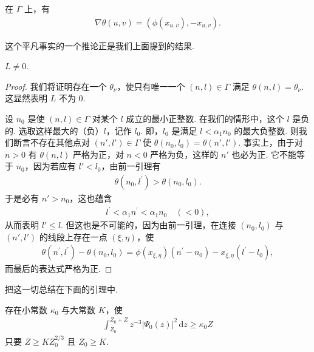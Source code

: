 \begin{lemma}\label{lem:9.21}
在 $\Gamma$ 上，有
\begin{align*}
  \nabla\theta(u,v)=(\phi(x_{u,v}),-x_{u,v}).
\end{align*}
\end{lemma}

这个平凡事实的一个推论正是我们上面提到的结果.

\begin{lemma}\label{lem:9.22}
$L \neq 0$.
\end{lemma}

\begin{proof}
我们将证明存在一个 $\theta_\nu$，使只有唯一一个 $(n,l) \in \Gamma$ 满足 $\theta(n,l) = \theta_\nu$. 这显然表明 $L$ 不为 $0$.

设 $n_0$ 是使 $(n, l) \in \Gamma$ 对某个 $l$ 成立的最小正整数. 在我们的情形中，这个 $l$ 是负的. 选取这样最大的（负）$l$，记作 $l_0$. 即，$l_0$ 是满足 $l < \alpha_1 n_0$ 的最大负整数. 则我们断言不存在其他点对 $(n', l') \in \Gamma$ 使 $\theta(n_0, l_0) = \theta(n', l')$. 事实上，由于对 $n > 0$ 有 $\theta(n, l)$ 严格为正，对 $n < 0$ 严格为负，这样的 $n'$ 也必为正. 它不能等于 $n_0$，因为若应有 $l' < l_0$，由前一引理有
\begin{align*}
  \theta(n_{0},l^{\prime})>\theta(n_{0},l_{0}).
\end{align*}
于是必有 $n' > n_0$，这也蕴含
\begin{align*}
  l^{\prime}<\alpha_{1}n^{\prime}<\alpha_{1}n_{0}\quad(<0),
\end{align*}
从而表明 $l' \leq l$. 但这也是不可能的，因为由前一引理，在连接 $(n_0, l_0)$ 与 $(n', l')$ 的线段上存在一点 $(\xi, \eta)$，使
\begin{align*}
  \theta(n^{\prime},l^{\prime})-\theta(n_{0},l_{0})
  =\phi(x_{\xi,\eta})\left(n^{\prime}-n_{0}\right)-x_{\xi,\eta}\left(l^{\prime}-l_{0}\right),
\end{align*}
而最后的表达式严格为正.
\end{proof}

把这一切总结在下面的引理中.

\begin{lemma}\label{lem:9.23}
存在小常数 $\kappa_{0}$ 与大常数 $K$，使
\begin{align*}
  \int_{Z_{0}}^{Z_{0}+Z}z^{-3}\left|\Psi_{0}(z)\right|^{2}\,\mathrm{d}z\geq\kappa_{0}Z
\end{align*}
只要 $Z \geq KZ_0^{2/3}$ 且 $Z_0 \geq K$.
\end{lemma}

